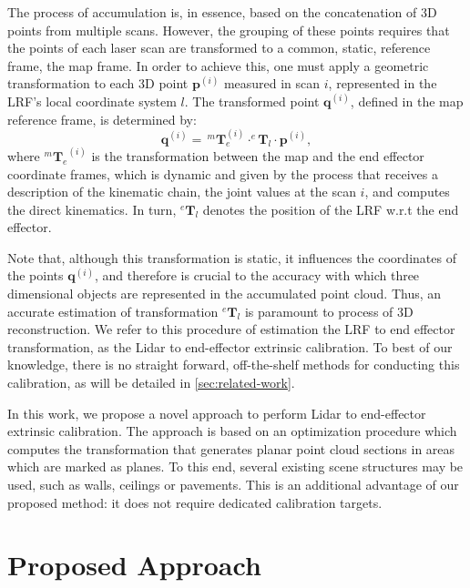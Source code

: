 \documentclass[conference]{IEEEtran}
\begin{document}
The process of accumulation is, in essence, based on the concatenation of 3D points from multiple scans. However, the grouping of these points requires that the points of each laser scan are transformed to a common, static, reference frame, the map frame. In order to achieve this, one must apply a geometric transformation to each 3D point $\mathbf{p}^{(i)}$ measured in scan $i$, represented in the LRF's local coordinate system $l$. The transformed point $\mathbf{q}^{(i)}$, defined in the map reference frame, is determined by:
%
\begin{equation}
    \mathbf{q}^{(i)} = \, ^{m}\mathbf{T}_{e}^{(i)} \cdot ^{e}\mathbf{T}_{l} \cdot \mathbf{p}^{(i)},
\end{equation}
%
\noindent where ${^{m}\mathbf{T}_{e}}^{(i)}$ is the transformation between the map and the end effector coordinate frames, which is dynamic and given by the process that receives a description of the kinematic chain, the joint values at the scan $i$, and computes the direct kinematics. In turn, $^{e}\mathbf{T}_{l}$ denotes the position of the LRF w.r.t the end effector. 

Note that, although this transformation is static, it influences the coordinates of the points $\mathbf{q}^{(i)}$, and therefore is crucial to the accuracy with which three dimensional objects are represented in the accumulated point cloud.
Thus, an accurate estimation of transformation $^{e}\mathbf{T}_{l}$ is paramount to process of 3D reconstruction. We refer to this procedure of estimation the LRF to end effector transformation, as the Lidar to end-effector extrinsic calibration. 
To best of our knowledge, there is no straight forward, off-the-shelf methods for 
conducting this calibration, as will be detailed in \cref{sec:related-work}.


In this work, we propose a novel approach to perform Lidar to end-effector extrinsic calibration. The approach is based on an optimization procedure which computes the transformation that generates planar point cloud sections in areas which are marked as planes. To this end, several existing scene structures may be used, such as walls, ceilings or pavements. This is an additional advantage of our proposed method: it does not require dedicated calibration targets.

\section{Proposed Approach}\label{sec:proposed_approach}
\end{document}
